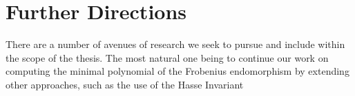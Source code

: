
\chapter{Further Directions} \label{ch-1}

There are a number of avenues of research we seek to pursue and include within the scope of the thesis. The most natural one being to continue our work on computing the minimal polynomial of the Frobenius endomorphism by extending other approaches, such as the use of the Hasse Invariant  


